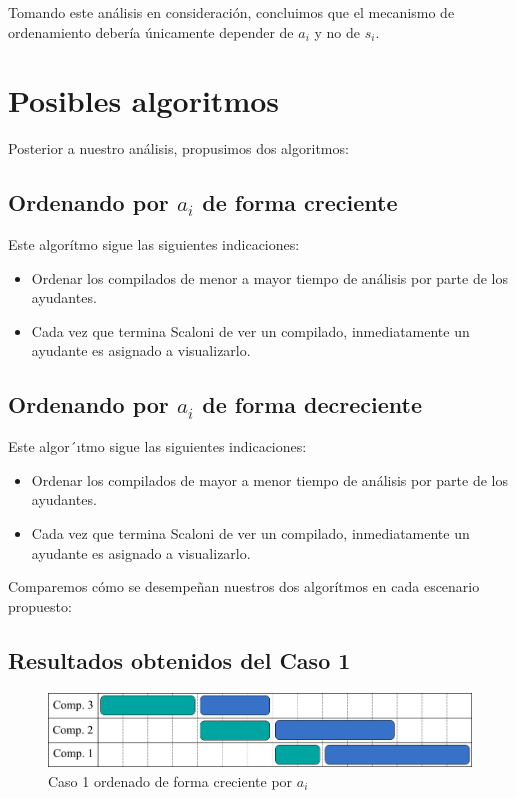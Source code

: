 Tomando este análisis en consideración, concluimos que el mecanismo de ordenamiento debería únicamente depender
de $a_i$ y no de $s_i$.

\section{Posibles algoritmos}

Posterior a nuestro análisis, propusimos dos algoritmos:

\subsection{Ordenando por $a_i$ de forma creciente}
Este algorítmo sigue las siguientes indicaciones:
\begin{itemize}
    \item Ordenar los compilados de menor a mayor tiempo de análisis por parte de los ayudantes.
    \item Cada vez que termina Scaloni de ver un compilado, inmediatamente un ayudante es asignado a visualizarlo.
\end{itemize}

\subsection{Ordenando por $a_i$ de forma decreciente}
Este algor´ıtmo sigue las siguientes indicaciones:
\begin{itemize}
    \item Ordenar los compilados de mayor a menor tiempo de análisis por parte de los ayudantes.
    \item Cada vez que termina Scaloni de ver un compilado, inmediatamente un ayudante es asignado a visualizarlo.
\end{itemize}

Comparemos cómo se desempeñan nuestros dos algorítmos en cada escenario propuesto:

\subsection{Resultados obtenidos del Caso 1}

\begin{figure}[H]
    \centering
    \includegraphics[width=1\textwidth]{img/caso-1-creciente.png}
    \caption{Caso 1 ordenado de forma creciente por $a_i$}
    \label{fig:Caso 1 ordenado de forma creciente por $a_i$}
\end{figure}


